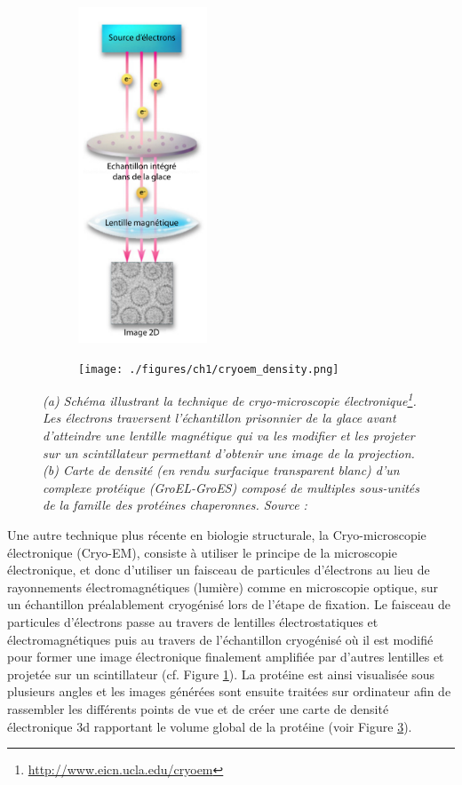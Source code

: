 \begin{figure}[htb]
  \begin{subfigure}{.4\textwidth}
  \centering
  {\includegraphics[height=10cm]{./figures/ch1/cryoem.pdf}}
    \caption{}
    \label{Fig:cryoem}
  \end{subfigure}
  \begin{subfigure}{.6\textwidth}
  \centering
  {\texttt{[image: ./figures/ch1/cryoem\_density.png]}}
  \caption{}
    \label{Fig:cryoem_density}
  \end{subfigure}
  \caption[(a) Schéma illustrant la technique de cryo-microscopie électronique. (b) Carte de densité électronique d'un complexe protéique.]{\it (a) Schéma illustrant la technique de cryo-microscopie électronique\footnote{\url{http://www.eicn.ucla.edu/cryoem}}. Les électrons traversent l'échantillon prisonnier de la glace avant d'atteindre une lentille magnétique qui va les modifier et les projeter sur un scintillateur permettant d'obtenir une image de la projection.
  (b) Carte de densité (en rendu surfacique transparent blanc) d'un complexe protéique (GroEL-GroES) composé de multiples sous-unités de la famille des protéines chaperonnes. Source : \cite{hoang2013gemfitter}}
\end{figure}

Une autre technique plus récente en biologie structurale, la Cryo-microscopie électronique (Cryo-EM), consiste à utiliser le principe de la microscopie électronique, et donc d'utiliser un faisceau de particules d'électrons au lieu de rayonnements électromagnétiques (lumière) comme en microscopie optique, sur un échantillon préalablement cryogénisé lors de l'étape de fixation. Le faisceau de particules d'électrons passe au travers de lentilles électrostatiques et électromagnétiques puis au travers de l'échantillon cryogénisé où il est modifié pour former une image électronique finalement amplifiée par d'autres lentilles et projetée sur un scintillateur (cf. Figure \ref{Fig:cryoem}).
La protéine est ainsi visualisée sous plusieurs angles et les images générées sont ensuite traitées sur ordinateur afin de rassembler les différents points de vue et de créer une carte de densité électronique 3d rapportant le volume global de la protéine (voir Figure \ref{Fig:cryoem_density}).

